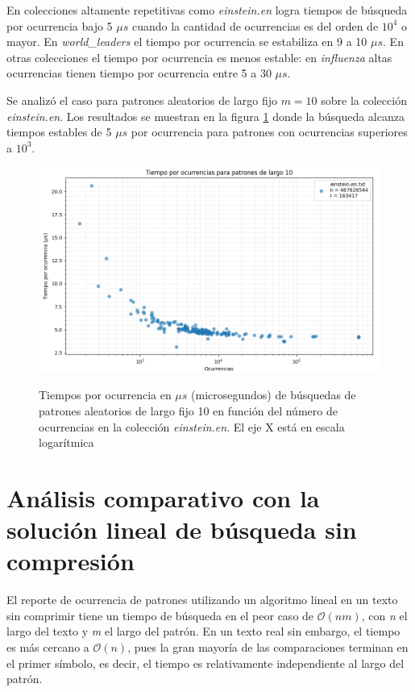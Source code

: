 En colecciones altamente repetitivas como \textit{einstein.en} logra tiempos de búsqueda por ocurrencia bajo 5 $\mu s$ cuando la cantidad de ocurrencias es del orden de $10^4$ o mayor. En \textit{world\_leaders} el tiempo por ocurrencia se estabiliza en 9 a 10 $\mu s$. En otras colecciones el tiempo por ocurrencia es menos estable: en \textit{influenza} altas ocurrencias tienen tiempo por ocurrencia entre 5 a 30 $\mu s$.

Se analizó el caso para patrones aleatorios de largo fijo $m = 10$ sobre la colección \textit{einstein.en}. Los resultados se muestran en la figura \ref{fig:searcheinsteinm10} donde la búsqueda alcanza tiempos estables de 5 $\mu s$ por ocurrencia para patrones con ocurrencias superiores a $10^3$.

\begin{figure}
    \centering
    \captionsetup{position=above}
    \caption{Tiempos por ocurrencia en $\mu s$ (microsegundos) de búsquedas de patrones aleatorios de largo fijo 10 en función del número de ocurrencias en la colección \textit{einstein.en}. El eje X está en escala logarítmica}
    \includegraphics[width=1\textwidth]{imagenes/TIME_M10_EINSTEIN.png} 
    \label{fig:searcheinsteinm10}
\end{figure}

\section{Análisis comparativo con la solución lineal de búsqueda sin compresión}

El reporte de ocurrencia de patrones utilizando un algoritmo lineal en un texto sin comprimir tiene un tiempo de búsqueda en el peor caso de $\mathcal{O}(n m)$, con \textit{n} el largo del texto y \textit{m} el largo del patrón. En un texto real sin embargo, el tiempo es más cercano a $\mathcal{O}(n)$, pues la gran mayoría de las comparaciones terminan en el primer símbolo, es decir, el tiempo es relativamente independiente al largo del patrón.


